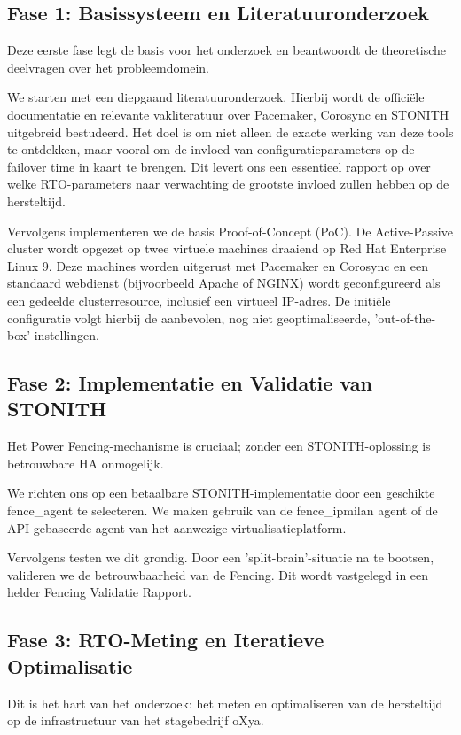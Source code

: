 \subsection{Fase 1: Basissysteem en Literatuuronderzoek}
Deze eerste fase legt de basis voor het onderzoek en beantwoordt de theoretische deelvragen over het probleemdomein.
\medskip

We starten met een diepgaand literatuuronderzoek. Hierbij wordt de officiële documentatie en relevante vakliteratuur over Pacemaker, Corosync en STONITH uitgebreid bestudeerd. Het doel is om niet alleen de exacte werking van deze tools te ontdekken, maar vooral om de invloed van configuratieparameters op de failover time in kaart te brengen. Dit levert ons een essentieel rapport op over welke RTO-parameters naar verwachting de grootste invloed zullen hebben op de hersteltijd.
\medskip

Vervolgens implementeren we de basis Proof-of-Concept (PoC). De Active-Passive cluster wordt opgezet op twee virtuele machines draaiend op Red Hat Enterprise Linux 9. Deze machines worden uitgerust met Pacemaker en Corosync en een standaard webdienst (bijvoorbeeld Apache of NGINX) wordt geconfigureerd als een gedeelde clusterresource, inclusief een virtueel IP-adres. De initiële configuratie volgt hierbij de aanbevolen, nog niet geoptimaliseerde, 'out-of-the-box' instellingen.

\subsection{Fase 2: Implementatie en Validatie van STONITH}
Het Power Fencing-mechanisme is cruciaal; zonder een STONITH-oplossing is betrouwbare HA onmogelijk.
\medskip

We richten ons op een betaalbare STONITH-implementatie door een geschikte fence\_agent te selecteren. We maken gebruik van de fence\_ipmilan agent of de API-gebaseerde agent van het aanwezige virtualisatieplatform.
\medskip

Vervolgens testen we dit grondig. Door een 'split-brain'-situatie na te bootsen, valideren we de betrouwbaarheid van de Fencing. Dit wordt vastgelegd in een helder Fencing Validatie Rapport.

\subsection{Fase 3: RTO-Meting en Iteratieve Optimalisatie}
Dit is het hart van het onderzoek: het meten en optimaliseren van de hersteltijd op de infrastructuur van het stagebedrijf oXya.
\medskip

